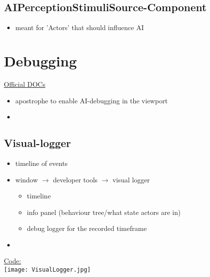         \subsection{AIPerceptionStimuliSource-Component}
            \begin{itemize}
                \item meant for 'Actors' that should influence AI
            \end{itemize}

    \section{Debugging}
        \href{https://docs.unrealengine.com/4.27/en-US/InteractiveExperiences/ArtificialIntelligence/AIDebugging/#perception}{Official DOCs}
        \begin{itemize}
            \item apostrophe to enable AI-debugging in the viewport
            \item 
        \end{itemize}

        \subsection{Visual-logger} \label{sec:visuallogger}
            \begin{itemize}
                \item timeline of events
                \item window $\rightarrow$ developer tools $\rightarrow$ visual logger
                \begin{itemize}
                    \item timeline
                    \item info panel (behaviour tree/what state actors are in)
                    \item debug logger for the recorded timeframe
                \end{itemize}
                    \item 
            \end{itemize}
            \underline{Code:} \\
            \texttt{[image: VisualLogger.jpg]} \\

